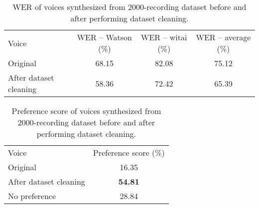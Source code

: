 \documentclass[12pt]{article}
\begin{document}
\begin{table}[]
\begin{center}
\caption{WER of voices synthesized from 2000-recording dataset before and after performing dataset cleaning.}
\label{tab_werCombination2000}
\vspace{3mm}
\begin{tabular}{lccc}
\hline
Voice & WER – Watson (\%) & WER – witai (\%) & WER – average (\%)\\
\cmidrule(l{0pt}r{2pt}){1-1}\cmidrule(l{0pt}r{2pt}){2-2}\cmidrule(l{0pt}r{2pt}){3-3}\cmidrule(l{0pt}r{2pt}){4-4}
Original            & 68.15 & 82.08 & 75.12 \\
After dataset cleaning & 58.36 & 72.42 & 65.39 \\
\hline
\end{tabular}
\end{center}
\end{table}

\begin{table}[]
\begin{center}
\caption{Preference score of voices synthesized from 2000-recording dataset before and after performing dataset cleaning.}
\label{tab_subEvaCombination2000}
\vspace{3mm}
\begin{tabular}{lc}
\hline
Voice & Preference score (\%) \\
\cmidrule(l{0pt}r{2pt}){1-1}\cmidrule(l{0pt}r{2pt}){2-2}
Original                & 16.35 \\
After dataset cleaning  & \textbf{54.81} \\
No preference           & 28.84 \\
\hline
\end{tabular}
\end{center}
\end{table}
\end{document}
